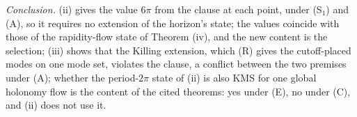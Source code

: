 \emph{Conclusion.} (ii) gives the value $6\pi$ from the clause at each point, under (S$_{1}$) and (A), so it requires no extension of the horizon's state; the values coincide with those of the rapidity-flow state of Theorem (iv), and the new content is the selection; (iii) shows that the Killing extension, which (R) gives the cutoff-placed modes on one mode set, violates the clause, a conflict between the two premises under (A); whether the period-$2\pi$ state of (ii) is also KMS for one global holonomy flow is the content of the cited theorems: yes under (E), no under (C), and (ii) does not use it.
